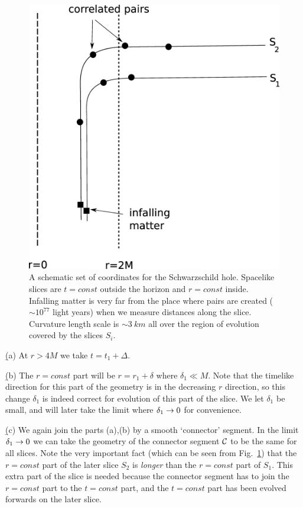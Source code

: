 \documentclass[12pt]{article}
\begin{document}
\begin{figure}[tbp]
\begin{center}
\includegraphics[scale=.18]{ftwo.eps}
\caption{{A schematic set of coordinates for the Schwarzschild hole. Spacelike slices are $t=const$ outside the horizon and $r=const$ inside. Infalling matter is very far from the place where pairs are created ($\sim 10^{77}$ light years) when we measure distances along the slice. Curvature length scale is $\sim 3 ~km$ all over the region of evolution covered by the slices $S_i$.}}
\label{ftwo}
\end{center}
\end{figure}
\b

(a)  At  $r>4M$  we take $t=t_1+\Delta$. 

\b



(b) The $r=const$ part will be
$r=r_1+\delta$
where $\delta_1\ll M$. Note that the timelike direction for this part of the geometry is in the decreasing $r$ direction, so this change $\delta_1$ is indeed correct for evolution  of this part of the slice.  We let $\delta_1$ be small, and will later take the limit where $\delta_1\rightarrow 0$ for convenience. 

\b


(c) We again join the parts (a),(b) by  a smooth `connector' segment. In the limit $\delta_1\rightarrow 0$ we can take the geometry of the connector segment ${\cal C}$ to be the same for all slices. Note the very important fact (which can be seen from Fig.~\ref{ftwo}) that the $r=const$ part of the later slice ${S}_2$ is {\it longer} than the $r=const$ part of ${ S}_1$. This extra part of the slice is needed because the connector segment has to join the $r=const$ part to the $t=const$ part, and the $t=const$ part has been evolved forwards on the later slice.  
\end{document}
